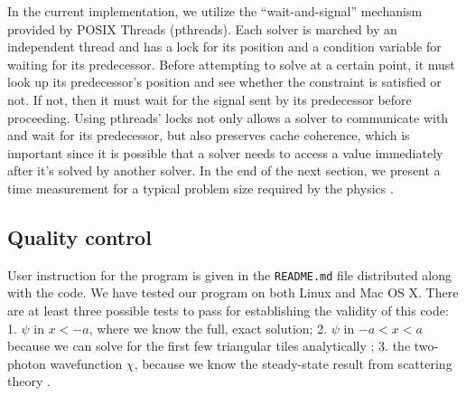 \documentclass[12pt,letter,onecolumn,notitlepage]{article}
\begin{document}
In the current implementation, we utilize the ``wait-and-signal'' mechanism provided by POSIX Threads (pthreads). Each solver is marched by an independent thread and has a lock for its position and a condition variable for waiting for its predecessor. Before attempting to solve at a certain point, it must look up its predecessor's position and see whether the constraint is satisfied or not. If not, then it must wait for the signal sent by its predecessor before proceeding. 
Using pthreads' locks not only allows a solver to communicate with and wait for its predecessor, but also preserves cache coherence, which is important since it is possible that a solver needs to access a value immediately after it's solved by another solver. 
In the end of the next section, we present a time measurement for a typical problem size required by the physics \cite{FangNM17,FangPRA15err,OurBIC}.

\subsection{Quality control}
User instruction for the program is given in the \texttt{README.md} file distributed along with the code.
We have tested our program on both Linux and Mac OS X.
There are at least three possible tests to pass for establishing the validity of this code: 1. $\psi$ in $x<-a$, where we know the full, exact solution; 2. $\psi$ in $-a<x<a$ because we can solve for the first few triangular tiles analytically \cite{FangNM17}; 3. the two-photon wavefunction $\chi$, because we know the steady-state result from scattering theory \cite{FangPRA15}.
\end{document}
